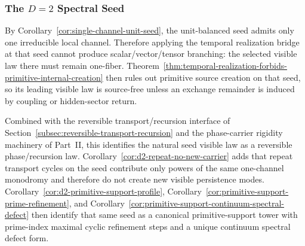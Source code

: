 \subsubsection{\texorpdfstring{The \(D=2\) Spectral Seed}{The D=2 Spectral Seed}}
\label{subsec:d2-spectral-seed}
\label{rem:d2-spectral-seed}

By Corollary~\ref{cor:single-channel-unit-seed}, the unit-balanced seed admits
only one irreducible local channel. Therefore applying the temporal
realization bridge at that seed cannot produce scalar/vector/tensor branching:
the selected visible law there must remain one-fiber.
Theorem~\ref{thm:temporal-realization-forbids-primitive-internal-creation}
then rules out primitive source creation on that seed, so its leading visible
law is source-free unless an exchange remainder is induced by coupling or
hidden-sector return.

Combined with the reversible transport/recursion interface of
Section~\ref{subsec:reversible-transport-recursion} and the phase-carrier
rigidity machinery of Part~II, this identifies the natural seed visible law as
a reversible phase/recursion law. Corollary~\ref{cor:d2-repeat-no-new-carrier}
adds that repeat transport cycles on the seed contribute only powers of the
same one-channel monodromy and therefore do not create new visible persistence
modes. Corollary~\ref{cor:d2-primitive-support-profile},
Corollary~\ref{cor:primitive-support-prime-refinement}, and
Corollary~\ref{cor:primitive-support-continuum-spectral-defect} then identify
that same seed as a canonical primitive-support tower with prime-index maximal
cyclic refinement steps and a unique continuum spectral defect form.

